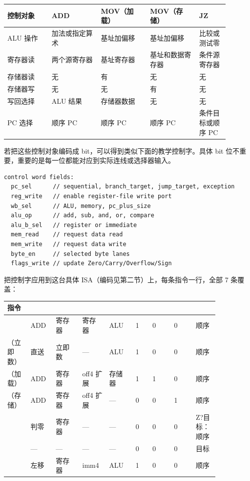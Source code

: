 \begin{longtable}{L{0.18\linewidth}L{0.2\linewidth}L{0.2\linewidth}L{0.2\linewidth}L{0.12\linewidth}}
\toprule
控制对象 & ADD & MOV（加载） & MOV（存储） & JZ \\
\midrule
ALU 操作 & 加法或指定算术 & 基址加偏移 & 基址加偏移 & 比较或测试零 \\\tablerowrule
寄存器读 & 两个源寄存器 & 基址寄存器 & 基址和数据寄存器 & 条件源寄存器 \\\tablerowrule
存储器读 & 无 & 有 & 无 & 无 \\\tablerowrule
存储器写 & 无 & 无 & 有 & 无 \\\tablerowrule
写回选择 & ALU 结果 & 存储器数据 & 无 & 无 \\\tablerowrule
PC 选择 & 顺序 PC & 顺序 PC & 顺序 PC & 条件目标或顺序 PC \\
\bottomrule
\end{longtable}

若把这些控制对象编码成 bit，可以得到类似下面的教学控制字。具体 bit 位不重要，重要的是每一位都能对应到实际连线或选择器输入。

\begin{lstlisting}
control word fields:
  pc_sel      // sequential, branch_target, jump_target, exception
  reg_write   // enable register-file write port
  wb_sel      // ALU, memory, pc_plus_size
  alu_op      // add, sub, and, or, compare
  alu_b_sel   // register or immediate
  mem_read    // request data read
  mem_write   // request data write
  byte_en     // selected byte lanes
  flags_write // update Zero/Carry/Overflow/Sign
\end{lstlisting}

把控制字应用到这台具体 ISA（编码见第二节）上，每条指令一行，全部 7 条覆盖：

{\setlength{\tabcolsep}{2pt}
\begin{longtable}{L{0.09\linewidth}L{0.1\linewidth}L{0.11\linewidth}L{0.11\linewidth}L{0.11\linewidth}L{0.07\linewidth}L{0.09\linewidth}L{0.09\linewidth}L{0.09\linewidth}}
\toprule
指令 &  &  &  &  &  &  &  &  \\
\midrule
{} & ADD & 寄存器 & 寄存器 & ALU & 1 & 0 & 0 & 顺序 \\\tablerowrule
{}（立即数） & 直送 & 立即数 & — & ALU & 1 & 0 & 0 & 顺序 \\\tablerowrule
{}（加载） & ADD & 寄存器 & off4 扩展 & 存储器 & 1 & 1 & 0 & 顺序 \\\tablerowrule
{}（存储） & ADD & 寄存器 & off4 扩展 & — & 0 & 0 & 1 & 顺序 \\\tablerowrule
{} & 判零 & 寄存器 & — & — & 0 & 0 & 0 & Z?目标：顺序 \\\tablerowrule
{} & — & — & — & — & 0 & 0 & 0 & 目标 \\\tablerowrule
{} & 左移 & 寄存器 & imm4 & ALU & 1 & 0 & 0 & 顺序 \\
\bottomrule
\end{longtable}
}

